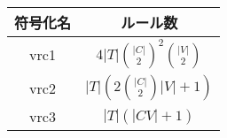 \begingroup
\renewcommand{\arraystretch}{1.5}
\begin{tabular}{|c|c|}\hline
  符号化名 & ルール数 \\ \hline
  vrc1 & $4|T|{|C|\choose 2}^{2}{|V|\choose 2}$ \\ \hline
  vrc2 & $|T|\left(2{|C|\choose 2}|V| + 1\right)$ \\ \hline
  vrc3 & $|T|(|CV| + 1)$ \\ \hline
\end{tabular}
\endgroup